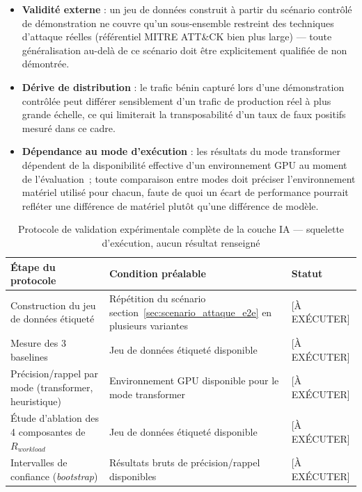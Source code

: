 \begin{itemize}
    \item \textbf{Validité externe} : un jeu de données construit à partir du scénario contrôlé de démonstration ne couvre qu'un sous-ensemble restreint des techniques d'attaque réelles (référentiel MITRE ATT\&CK bien plus large) — toute généralisation au-delà de ce scénario doit être explicitement qualifiée de non démontrée.
    \item \textbf{Dérive de distribution} : le trafic bénin capturé lors d'une démonstration contrôlée peut différer sensiblement d'un trafic de production réel à plus grande échelle, ce qui limiterait la transposabilité d'un taux de faux positifs mesuré dans ce cadre.
    \item \textbf{Dépendance au mode d'exécution} : les résultats du mode transformer dépendent de la disponibilité effective d'un environnement GPU au moment de l'évaluation~; toute comparaison entre modes doit préciser l'environnement matériel utilisé pour chacun, faute de quoi un écart de performance pourrait refléter une différence de matériel plutôt qu'une différence de modèle.
\end{itemize}

\begin{table}[htbp]
\centering
\scriptsize
\begin{tabular}{@{}p{3.6cm}p{4.6cm}p{4.6cm}@{}}
\toprule
\textbf{Étape du protocole} & \textbf{Condition préalable} & \textbf{Statut} \\
\midrule
Construction du jeu de données étiqueté & Répétition du scénario section~\ref{sec:scenario_attaque_e2e} en plusieurs variantes & [À EXÉCUTER] \\
Mesure des 3 baselines & Jeu de données étiqueté disponible & [À EXÉCUTER] \\
Précision/rappel par mode (transformer, heuristique) & Environnement GPU disponible pour le mode transformer & [À EXÉCUTER] \\
Étude d'ablation des 4 composantes de $R_{workload}$ & Jeu de données étiqueté disponible & [À EXÉCUTER] \\
Intervalles de confiance (\textit{bootstrap}) & Résultats bruts de précision/rappel disponibles & [À EXÉCUTER] \\
\bottomrule
\end{tabular}
\caption{Protocole de validation expérimentale complète de la couche IA — squelette d'exécution, aucun résultat renseigné}
\label{tab:protocole_validation_ia}
\end{table}

